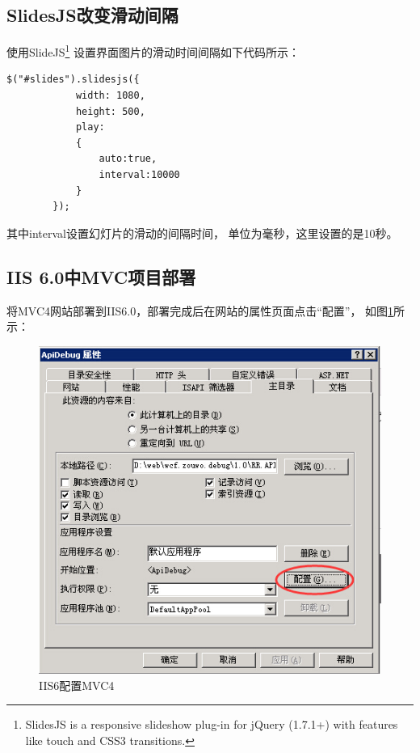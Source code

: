 \documentclass{book}
\begin{document}
\subsection{SlidesJS改变滑动间隔}

使用SlideJS\footnote{SlidesJS is a responsive slideshow plug-in 
for jQuery (1.7.1+) with features like touch and CSS3 transitions. }
设置界面图片的滑动时间间隔如下代码所示：

\begin{lstlisting}
$("#slides").slidesjs({
			width: 1080,
			height: 500,
			play: 
			{
				auto:true,
				interval:10000
			}
		});
\end{lstlisting}

其中interval设置幻灯片的滑动的间隔时间，
单位为毫秒，这里设置的是10秒。

\subsection{IIS 6.0中MVC项目部署}

将MVC4网站部署到IIS6.0，部署完成后在网站的属性页面点击“配置”，
如图\ref{fig:IIS6MVC4ConfigAttribute}所示：

\begin{figure}[htbp]
	\centering
	\includegraphics[scale=0.8]{IIS6MVC4ConfigAttribute.jpg}
	\caption{IIS6配置MVC4}
	\label{fig:IIS6MVC4ConfigAttribute}
\end{figure}
\end{document}
